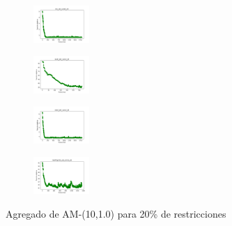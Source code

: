 \begin{figure}[H]
\begin{subfigure}
    \end{subfigure}
    \hfill
    \begin{subfigure}
        \centering
        \includegraphics[width=0.234\textwidth]{img/am10/iris_set_const_20_3773969821_cost.png}
    \end{subfigure}
    \hfill
    \begin{subfigure}
        \centering
        \includegraphics[width=0.234\textwidth]{img/am10/ecoli_set_const_20_3773969821_cost.png}
    \end{subfigure}
    \hfill
    \begin{subfigure}
        \centering
        \includegraphics[width=0.234\textwidth]{img/am10/rand_set_const_20_3773969821_cost.png}
    \end{subfigure}
    \hfill
    \begin{subfigure}
        \centering
        \includegraphics[width=0.234\textwidth]{img/am10/newthyroid_set_const_20_3773969821_cost.png}
    \end{subfigure}
    \caption{Agregado de AM-(10,1.0) para 20\% de restricciones}
\end{figure}

\vspace*{\fill}
\newpage


